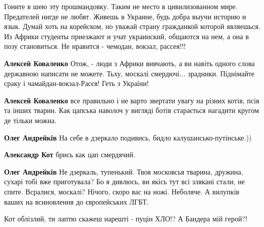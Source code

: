 \begin{itemize}
Гоните в шею эту прошмандовку. Таким не место в цивилизованном мире. Предателей
нигде не любят. Живешь в Украине, будь добра выучи историю и язык. Думай хоть
на корейском, но уважай страну гражданкой которой являешься. Из Африки студенты
приезжают и учат украинский, общаются на нем, а она в позу становиться. Не
нравится - чемодан, вокзал, рассея!!!

\begin{itemize}

\textbf{Алексей Коваленко} Отож, - люди з Африки вивчають, а ви навіть одного слова державною написати не можете. Тьху, москалі смердючі... зрадники. Піднімайте сраку і чамайдан-вокзал-Расєя! Геть з України!


\textbf{Алексей Коваленко} все правильно і не варто звертати увагу на різних котів, псів та інших тварин. Как цапська наволоч у вигляді ботів старається нагадити кругом де тільки можна. 👍🏻


\textbf{Олег Андрейків} На себе в дзеркало подивись, бидло калушансько-путінське.))


\textbf{Александр Кот} брись как цап смердячий.


\textbf{Олег Андрейків} Не дзеркаль, тупенький. Твоя московсья тварина, дружина, сухарі тобі вже приготувала? Бо я дивлюсь, ви якісь тут всі злякані стали, не спите. Всралися, москалі? Нічого, скоро вас на ножі. Неболяче. А вилупків ваших на всиновлення до європейських ЛГБТ.


Кот облізлий, ти лаптю скажеш нарешті - пуцін ХЛО!? А Бандера мій герой?!



\end{itemize}
\end{itemize}
